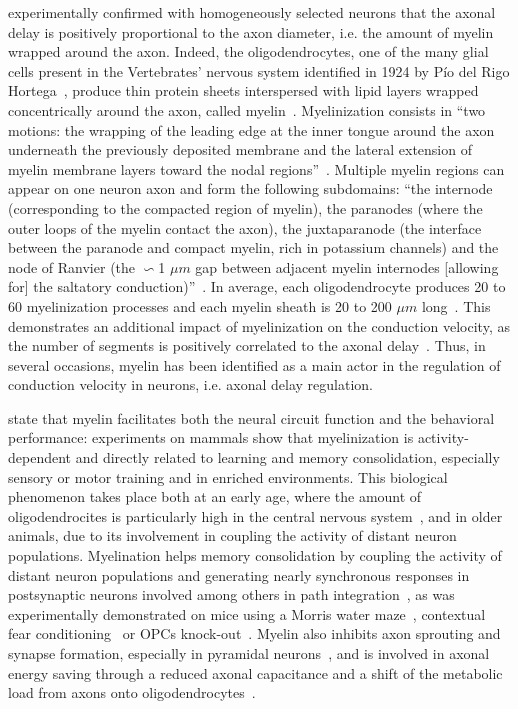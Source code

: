 \documentclass[brainsci, %
               review,submit,pdftex,moreauthors
               ]{Definitions/mdpi}
\begin{document}
\citet{gasser_axon_1939} experimentally confirmed with homogeneously selected neurons that the axonal delay is positively proportional to the axon diameter, i.e. the amount of myelin wrapped around the axon. Indeed, the oligodendrocytes, one of the many glial cells present in the Vertebrates' nervous system identified in 1924 by Pío del Rigo Hortega~\citep{perez-cerda_pio_2015}, produce thin protein sheets interspersed with lipid layers wrapped concentrically around the axon, called myelin~\citep{schmitt_ultrastructure_1939}. Myelinization consists in ``two motions: the wrapping of the leading edge at the inner tongue around the axon underneath the previously deposited membrane and the lateral extension of myelin membrane layers toward the nodal regions''~\citep{simons_oligodendrocytes_2016}. Multiple myelin regions can appear on one neuron axon and form the following subdomains: ``the internode (corresponding to the compacted region of myelin), the paranodes (where the outer loops of the myelin contact the axon), the juxtaparanode (the interface between the paranode and compact myelin, rich in potassium channels) and the node of Ranvier (the $\backsim$1 $\mu m$ gap between adjacent myelin internodes [allowing for] the saltatory conduction)''~\citep{duncan_2021}. In average, each oligodendrocyte produces 20 to 60 myelinization processes and each myelin sheath is 20 to 200 $\mu m$ long~\citep{simons_oligodendrocytes_2016}. This demonstrates an additional impact of myelinization on the conduction velocity, as the number of segments is positively correlated to the axonal delay~\citep{brill_conduction_1977}. Thus, in several occasions, myelin has been identified as a main actor in the regulation of conduction velocity in neurons, i.e. axonal delay regulation.


\citet{fields_new_2015, fields_myelin_2020} state that myelin facilitates both the neural circuit function and the behavioral performance: experiments on mammals show that myelinization is activity-dependent and directly related to learning and memory consolidation, especially sensory or motor training and in enriched environments. This biological phenomenon takes place both at an early age, where the amount of oligodendrocites is particularly high in the central nervous system~\citep{reynolds_study_1928}, and in older animals, due to its involvement in coupling the activity of distant neuron populations. Myelination helps memory consolidation by coupling the activity of distant neuron populations and generating nearly synchronous responses in postsynaptic neurons involved among others in path integration~\citep{madadi_asl_dendritic_2018}, as was experimentally demonstrated on mice using a Morris water maze~\citep{steadman_disruption_2020}, contextual fear conditioning~\citep{pan_preservation_2020} or OPCs knock-out~\citep{wan_impaired_2020}. Myelin also inhibits axon sprouting and synapse formation, especially in pyramidal neurons~\citep{fields_new_2015}, and is involved in axonal energy saving through a reduced axonal capacitance and a shift of the metabolic load from axons onto oligodendrocytes~\citep{duncan_neuron-oligodendrocyte_2021}.
\end{document}
